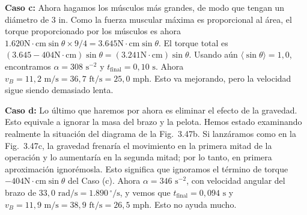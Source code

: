 \documentclass[12pt]{book}
\begin{document}
\textbf{Caso c:} Ahora hagamos los músculos más grandes, de modo que tengan un diámetro de $3\text{ in}$. Como la fuerza muscular máxima es proporcional al área, el torque proporcionado por los músculos es ahora $1.620\text{N}\cdot\text{cm}\sin\theta \times 9/4 = 3.645\text{N}\cdot\text{cm}\sin\theta$. El torque total es $(3.645 - 404\text{N}\cdot\text{cm})\sin\theta = (3.241\text{N}\cdot\text{cm})\sin\theta$. Usando aún $\langle\sin\theta\rangle = 1{,}0$, encontramos $\alpha = 308\text{ s}^{-2}$ y $t_{\text{final}} = 0{,}10\text{ s}$. Ahora $v_B = 11{,}2\text{ m/s} = 36{,}7\text{ ft/s} = 25{,}0\text{ mph}$. Esto va mejorando, pero la velocidad sigue siendo demasiado lenta.

\textbf{Caso d:} Lo último que haremos por ahora es eliminar el efecto de la gravedad. Esto equivale a ignorar la masa del brazo y la pelota. Hemos estado examinando realmente la situación del diagrama de la Fig.~3.47b. Si lanzáramos como en la Fig.~3.47c, la gravedad frenaría el movimiento en la primera mitad de la operación y lo aumentaría en la segunda mitad; por lo tanto, en primera aproximación ignorémosla. Esto significa que ignoramos el término de torque $-404\text{N}\cdot\text{cm}\sin\theta$ del Caso (c). Ahora $\alpha = 346\text{ s}^{-2}$, con velocidad angular del brazo de $33{,}0\text{ rad/s} = 1.890\,^\circ/\text{s}$, y vemos que $t_{\text{final}} = 0{,}094\text{ s}$ y $v_B = 11{,}9\text{ m/s} = 38{,}9\text{ ft/s} = 26{,}5\text{ mph}$. Esto no ayuda mucho.
\end{document}
